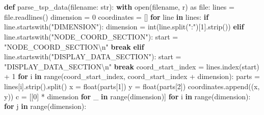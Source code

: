 \documentclass[
  letterpaper,
  DIV=11,
  numbers=noendperiod]{scrartcl}
\newenvironment{Shaded}{\begin{snugshade}}{\end{snugshade}}
\newcommand{\BuiltInTok}[1]{\textcolor[rgb]{0.00,0.23,0.31}{#1}}
\newcommand{\CharTok}[1]{\textcolor[rgb]{0.13,0.47,0.30}{#1}}
\newcommand{\ControlFlowTok}[1]{\textcolor[rgb]{0.00,0.23,0.31}{\textbf{#1}}}
\newcommand{\DecValTok}[1]{\textcolor[rgb]{0.68,0.00,0.00}{#1}}
\newcommand{\ImportTok}[1]{\textcolor[rgb]{0.00,0.46,0.62}{#1}}
\newcommand{\KeywordTok}[1]{\textcolor[rgb]{0.00,0.23,0.31}{\textbf{#1}}}
\newcommand{\NormalTok}[1]{\textcolor[rgb]{0.00,0.23,0.31}{#1}}
\newcommand{\OperatorTok}[1]{\textcolor[rgb]{0.37,0.37,0.37}{#1}}
\newcommand{\StringTok}[1]{\textcolor[rgb]{0.13,0.47,0.30}{#1}}
\begin{document}
\section{}\label{section}

\begin{Shaded}
\begin{Highlighting}[]
\KeywordTok{def}\NormalTok{ parse\_tsp\_data(filename: }\BuiltInTok{str}\NormalTok{):}
    \ControlFlowTok{with} \BuiltInTok{open}\NormalTok{(filename, }\StringTok{\textquotesingle{}r\textquotesingle{}}\NormalTok{) }\ImportTok{as} \BuiltInTok{file}\NormalTok{:}
\NormalTok{        lines }\OperatorTok{=} \BuiltInTok{file}\NormalTok{.readlines()}
\NormalTok{    dimension }\OperatorTok{=} \DecValTok{0}
\NormalTok{    coordinates }\OperatorTok{=}\NormalTok{ []}
    \ControlFlowTok{for}\NormalTok{ line }\KeywordTok{in}\NormalTok{ lines:}
        \ControlFlowTok{if}\NormalTok{ line.startswith(}\StringTok{"DIMENSION"}\NormalTok{):}
\NormalTok{            dimension }\OperatorTok{=} \BuiltInTok{int}\NormalTok{(line.split(}\StringTok{":"}\NormalTok{)[}\DecValTok{1}\NormalTok{].strip())}
        \ControlFlowTok{elif}\NormalTok{ line.startswith(}\StringTok{"NODE\_COORD\_SECTION"}\NormalTok{):}
\NormalTok{            start }\OperatorTok{=} \StringTok{"NODE\_COORD\_SECTION}\CharTok{\textbackslash{}n}\StringTok{"}
            \ControlFlowTok{break} 
        \ControlFlowTok{elif}\NormalTok{ line.startswith(}\StringTok{"DISPLAY\_DATA\_SECTION"}\NormalTok{):}
\NormalTok{            start }\OperatorTok{=} \StringTok{"DISPLAY\_DATA\_SECTION}\CharTok{\textbackslash{}n}\StringTok{"}
            \ControlFlowTok{break}
\NormalTok{    coord\_start\_index }\OperatorTok{=}\NormalTok{ lines.index(start) }\OperatorTok{+} \DecValTok{1}
    \ControlFlowTok{for}\NormalTok{ i }\KeywordTok{in} \BuiltInTok{range}\NormalTok{(coord\_start\_index, coord\_start\_index }\OperatorTok{+}\NormalTok{ dimension):}
\NormalTok{        parts }\OperatorTok{=}\NormalTok{ lines[i].strip().split()}
\NormalTok{        x }\OperatorTok{=} \BuiltInTok{float}\NormalTok{(parts[}\DecValTok{1}\NormalTok{])}
\NormalTok{        y }\OperatorTok{=} \BuiltInTok{float}\NormalTok{(parts[}\DecValTok{2}\NormalTok{])}
\NormalTok{        coordinates.append((x, y))}
\NormalTok{    c }\OperatorTok{=}\NormalTok{ [[}\DecValTok{0}\NormalTok{] }\OperatorTok{*}\NormalTok{ dimension }\ControlFlowTok{for}\NormalTok{ \_ }\KeywordTok{in} \BuiltInTok{range}\NormalTok{(dimension)]}
    \ControlFlowTok{for}\NormalTok{ i }\KeywordTok{in} \BuiltInTok{range}\NormalTok{(dimension):}
        \ControlFlowTok{for}\NormalTok{ j }\KeywordTok{in} \BuiltInTok{range}\NormalTok{(dimension):}

\end{Highlighting}
\end{Shaded}
\end{document}
